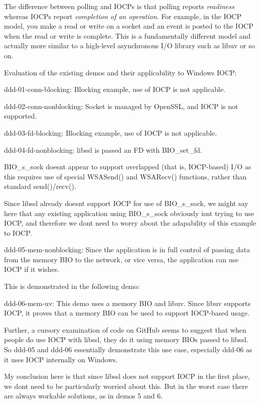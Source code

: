 The difference between polling and IOCPs is that polling reports {\itshape readiness} whereas IOCPs report {\itshape completion of an operation}. For example, in the IOCP model, you make a read or write on a socket and an event is posted to the IOCP when the read or write is complete. This is a fundamentally different model and actually more similar to a high-\/level asynchronous I/O library such as libuv or so on.

Evaluation of the existing demos and their applicability to Windows IOCP\+:


\begin{DoxyItemize}
\item ddd-\/01-\/conn-\/blocking\+: Blocking example, use of IOCP is not applicable.
\item ddd-\/02-\/conn-\/nonblocking\+: Socket is managed by Open\+SSL, and IOCP is not supported.
\item ddd-\/03-\/fd-\/blocking\+: Blocking example, use of IOCP is not applicable.
\item ddd-\/04-\/fd-\/nonblocking\+: libssl is passed an FD with BIO\+\_\+set\+\_\+fd.

BIO\+\_\+s\+\_\+sock doesn\textquotesingle{}t appear to support overlapped (that is, IOCP-\/based) I/O as this requires use of special WSASend() and WSARecv() functions, rather than standard send()/recv().

Since libssl already doesn\textquotesingle{}t support IOCP for use of BIO\+\_\+s\+\_\+sock, we might say here that any existing application using BIO\+\_\+s\+\_\+sock obviously isn\textquotesingle{}t trying to use IOCP, and therefore we don\textquotesingle{}t need to worry about the adapability of this example to IOCP.
\item ddd-\/05-\/mem-\/nonblocking\+: Since the application is in full control of passing data from the memory BIO to the network, or vice versa, the application can use IOCP if it wishes.

This is demonstrated in the following demo\+:
\item ddd-\/06-\/mem-\/uv\+: This demo uses a memory BIO and libuv. Since libuv supports IOCP, it proves that a memory BIO can be used to support IOCP-\/based usage.
\end{DoxyItemize}

Further, a cursory examination of code on Git\+Hub seems to suggest that when people do use IOCP with libssl, they do it using memory BIOs passed to libssl. So ddd-\/05 and ddd-\/06 essentially demonstrate this use case, especially ddd-\/06 as it uses IOCP internally on Windows.

My conclusion here is that since libssl does not support IOCP in the first place, we don\textquotesingle{}t need to be particularly worried about this. But in the worst case there are always workable solutions, as in demos 5 and 6. 
